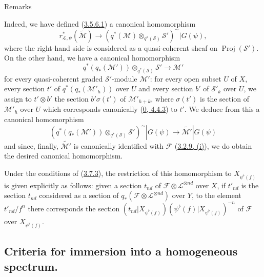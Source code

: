\begin{namedtheorem}[3.7.9]{Remarks}
\begin{enumerate}
    Indeed, we have defined (\hyperref[II.3.5.6.1]{3.5.6.1}) a
    canonical homomorphism
    \[
    \label{II.3.7.9.3}
      r_{\mathcal{L},\psi}^*(\widetilde{\mathcal{M}})
      \longrightarrow
      (q^*(\mathcal{M})\otimes_{q^*(\mathcal{S})}\mathcal{S}')^{\sim}
      |G(\psi),
    \tag{3.7.9.3}
    \]
    where the right-hand side is considered as a quasi-coherent sheaf on
    $\operatorname{Proj}(\mathcal{S}')$. On the other hand, we have a
    canonical homomorphism
    \[
    \label{II.3.7.9.4}
      q^*(q_*(\mathcal{M}'))\otimes_{q^*(\mathcal{S})}\mathcal{S}'
      \longrightarrow\mathcal{M}'
    \tag{3.7.9.4}
    \]
    for every quasi-coherent graded $\mathcal{S}'$-module $\mathcal{M}'$:
    for every open subset $U$ of $X$, every section $t'$ of
    $q^*(q_*(\mathcal{M}'_h))$ over $U$ and every section $b'$ of
    $\mathcal{S}'_k$ over $U$, we assign to $t'\otimes b'$ the
    section $b'\sigma(t')$ of $\mathcal{M}'_{h+k}$, where $\sigma(t')$ is the
    section of $\mathcal{M}'_h$ over $U$ which corresponds canonically
    (\hyperref[0.4.4.3]{0, 4.4.3}) to $t'$. We deduce from this a
    canonical homomorphism
    \[
    \label{II.3.7.9.5}
      (q^*(q_*(\mathcal{M}'))\otimes_{q^*(\mathcal{S})}\mathcal{S}')^{\sim}
      |G(\psi)\longrightarrow\widetilde{\mathcal{M}'}|G(\psi)
    \tag{3.7.9.5}
    \]
    and since, finally, $\widetilde{\mathcal{M}'}$ is canonically identified
    with $\mathcal{F}$
    (\hyperref[II.3.2.9]{3.2.9, (i)}), we do obtain the desired canonical
    homomorphism.

    Under the conditions of (\hyperref[II.3.7.3]{3.7.3}), the restriction
    of this homomorphism to $X_{\psi^\flat(f)}$ is given explicitly as
    follows: given a section $t_{nd}$ of
    $\mathcal{F}\otimes\mathcal{L}^{\otimes nd}$ over $X$, if
    $t'_{nd}$ is the section $t_{nd}$ considered as a section of
    $q_*(\mathcal{F}\otimes\mathcal{L}^{\otimes nd})$ over $Y$, to
    the element $t'_{nd}/f^n$ there corresponds the section
    $(t_{nd}|X_{\psi^\flat(f)})
    (\psi^\flat(f)|X_{\psi^\flat(f)})^{-n}$ of $\mathcal{F}$ over
    $X_{\psi^\flat(f)}$.
\end{enumerate}
\end{namedtheorem}



\subsection{Criteria for immersion into a homogeneous spectrum.}
\label{subsection:II.3.8}

